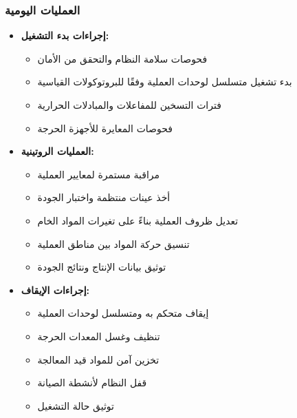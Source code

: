 \subsubsection{العمليات اليومية}
\begin{itemize}
    \item \textbf{إجراءات بدء التشغيل:}
    \begin{itemize}
        \item فحوصات سلامة النظام والتحقق من الأمان
        \item بدء تشغيل متسلسل لوحدات العملية وفقًا للبروتوكولات القياسية
        \item فترات التسخين للمفاعلات والمبادلات الحرارية
        \item فحوصات المعايرة للأجهزة الحرجة
    \end{itemize}
    
    \item \textbf{العمليات الروتينية:}
    \begin{itemize}
        \item مراقبة مستمرة لمعايير العملية
        \item أخذ عينات منتظمة واختبار الجودة
        \item تعديل ظروف العملية بناءً على تغيرات المواد الخام
        \item تنسيق حركة المواد بين مناطق العملية
        \item توثيق بيانات الإنتاج ونتائج الجودة
    \end{itemize}
    
    \item \textbf{إجراءات الإيقاف:}
    \begin{itemize}
        \item إيقاف متحكم به ومتسلسل لوحدات العملية
        \item تنظيف وغسل المعدات الحرجة
        \item تخزين آمن للمواد قيد المعالجة
        \item قفل النظام لأنشطة الصيانة
        \item توثيق حالة التشغيل
    \end{itemize}
\end{itemize}

